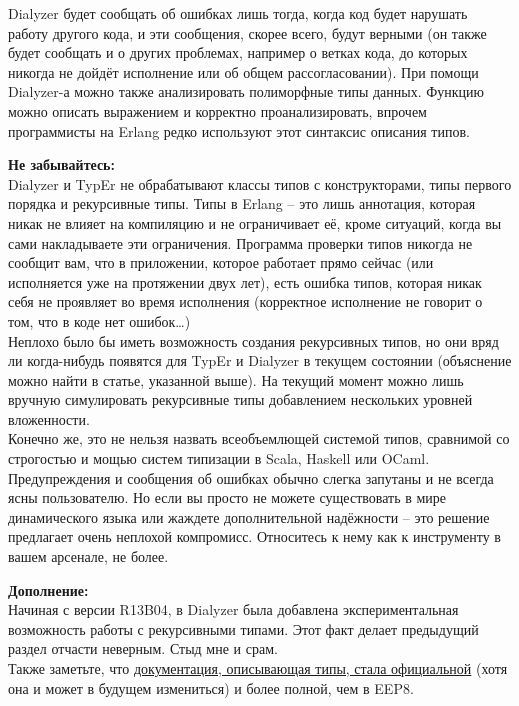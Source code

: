 Dialyzer будет сообщать об ошибках лишь тогда, когда код будет нарушать работу другого кода, и эти сообщения, скорее всего, будут верными (он также будет сообщать и о других проблемах, например о ветках кода, до которых никогда не дойдёт исполнение или об общем рассогласовании).
При помощи Dialyzer\--а можно также анализировать полиморфные типы данных.
Функцию  можно описать выражением  и корректно проанализировать, впрочем программисты на Erlang редко используют этот синтаксис описания типов.\\
\colorbox{lorange}
{
    \begin{minipage}{\linewidth}
        \textbf{Не забывайтесь:}\\
Dialyzer и TypEr не обрабатывают классы типов с конструкторами, типы первого порядка и рекурсивные типы.
Типы в Erlang \--- это лишь аннотация, которая никак не влияет на компиляцию и не ограничивает её, кроме ситуаций, когда вы сами накладываете эти ограничения.
Программа проверки типов никогда не сообщит вам, что в приложении, которое работает прямо сейчас (или исполняется уже на протяжении двух лет), есть ошибка типов, которая никак себя не проявляет во время исполнения (корректное исполнение не говорит о том, что в коде нет ошибок\ldots)\\
Неплохо было бы иметь возможность создания рекурсивных типов, но они вряд ли когда\--нибудь появятся для TypEr и Dialyzer в текущем состоянии (объяснение можно найти в статье, указанной выше).
На текущий момент можно лишь вручную симулировать рекурсивные типы добавлением нескольких уровней вложенности.\\
Конечно же, это не нельзя назвать  всеобъемлющей системой типов, сравнимой со строгостью и мощью систем типизации в Scala, Haskell или OCaml.
Предупреждения и сообщения об ошибках обычно слегка запутаны и не всегда ясны пользователю.
Но если вы просто не можете существовать в мире динамического языка или жаждете дополнительной надёжности \--- это решение предлагает очень неплохой компромисс.
Относитесь к нему как к инструменту в вашем арсенале, не более.
    \end{minipage}
}
\colorbox{lgray}
{
    \begin{minipage}{\linewidth}
\textbf{Дополнение:}\\
Начиная с версии R13B04, в Dialyzer была добавлена экспериментальная возможность работы с рекурсивными типами.
Этот факт делает предыдущий раздел отчасти неверным.
Стыд мне и срам.\\
Также заметьте, что \href{http://erlang.org/doc/reference\_manual/typespec.html}{документация, описывающая типы, стала официальной} (хотя она и может в будущем измениться) и более полной, чем в EEP8.
    \end{minipage}
}
